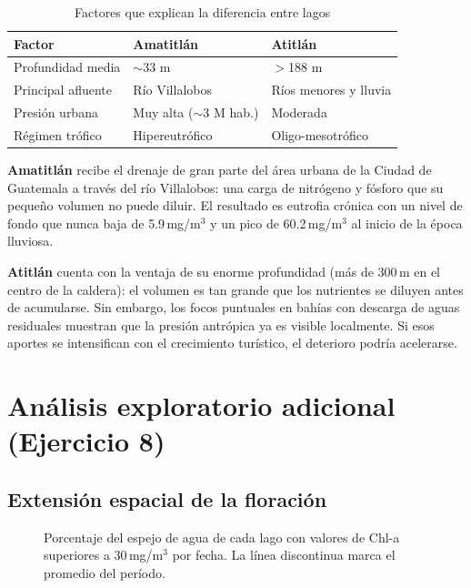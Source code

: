 \documentclass[12pt, a4paper]{article}
\newcommand{\lago}[1]{\textbf{#1}}
\newcommand{\mgm}{\,mg/m$^3$}
\begin{document}
\begin{table}[H]
\centering
\caption{Factores que explican la diferencia entre lagos}
\begin{tabular}{lll}
\toprule
\textbf{Factor} & \textbf{Amatitlán} & \textbf{Atitlán} \\
\midrule
Profundidad media   & $\sim$33 m           & $>$188 m \\
Principal afluente  & Río Villalobos       & Ríos menores y lluvia \\
Presión urbana      & Muy alta ($\sim$3 M hab.) & Moderada \\
Régimen trófico     & Hipereutrófico       & Oligo-mesotrófico \\
\bottomrule
\end{tabular}
\end{table}

\lago{Amatitlán} recibe el drenaje de gran parte del área urbana de la Ciudad de Guatemala
a través del río Villalobos: una carga de nitrógeno y fósforo que su pequeño volumen no puede
diluir. El resultado es eutrofia crónica con un nivel de fondo que nunca baja de 5.9\mgm{} y
un pico de 60.2\mgm{} al inicio de la época lluviosa.

\lago{Atitlán} cuenta con la ventaja de su enorme profundidad (más de 300\,m en el centro de
la caldera): el volumen es tan grande que los nutrientes se diluyen antes de acumularse. Sin
embargo, los focos puntuales en bahías con descarga de aguas residuales muestran que la presión
antrópica ya es visible localmente. Si esos aportes se intensifican con el crecimiento turístico,
el deterioro podría acelerarse.

\section{Análisis exploratorio adicional (Ejercicio 8)}

\subsection{Extensión espacial de la floración}

\begin{figure}[H]
  \centering
  \caption{Porcentaje del espejo de agua de cada lago con valores de Chl-a superiores a 30\mgm{} por fecha. La línea discontinua marca el promedio del período.}
  \label{fig:extension}
\end{figure}
\end{document}
